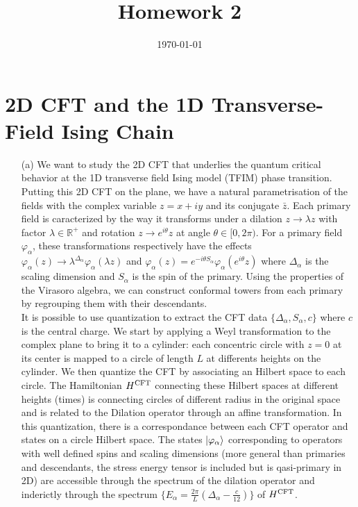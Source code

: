 \documentclass[10pt, a4paper]{article}
\title{Homework 2} %
\author{\PA} %
\date{\today} %
\begin{document}
\maketitlepage

\maketableofcontents


\footnotesize{

\section{2D CFT and the 1D Transverse-Field Ising Chain}

\begin{enumerate}
  \item[(a)] We want to study the 2D CFT that underlies the quantum critical behavior at the 1D transverse field Ising model (TFIM) phase transition. Putting this 2D CFT on the plane, we have a natural parametrisation of the fields with the complex variable $z = x+iy$ and its conjugate $\bar{z}$. Each primary field is caracterized by the way it transforms under a dilation $z \to \lambda z$ with factor $\lambda \in \mathbb{R}^+$ and rotation $z \to e^{i \theta} z$ at angle $\theta \in [0, 2\pi)$. For a primary field $\varphi_\alpha$, these transformations respectively have the effects $\varphi_\alpha(z) \to \lambda^{\Delta_\alpha}\varphi_{\alpha}(\lambda z)$ and $\varphi_{\alpha}(z) = e^{- i \theta S_\alpha} \varphi_{\alpha}(e^{i \theta} z)$ where $\Delta_\alpha$ is the scaling dimension and $S_\alpha$ is the spin of the primary. Using the properties of the Virasoro algebra, we can construct conformal towers from each primary by regrouping them with their descendants. \\
  
  It is possible to use quantization to extract the CFT data $\{\Delta_\alpha, S_\alpha, c\}$ where $c$ is the central charge. We start by applying a Weyl transformation to the complex plane to bring it to a cylinder: each concentric circle with $z=0$ at its center is mapped to a circle of length $L$ at differents heights on the cylinder. We then quantize the CFT by associating an Hilbert space to each circle. The Hamiltonian $H^{\rm CFT}$ connecting these Hilbert spaces at different heights (times) is connecting circles of different radius in the original space and is related to the Dilation operator through an affine transformation. In this quantization, there is a correspondance between each CFT operator and states on a circle Hilbert space. The states $\ket{\varphi_\alpha}$ corresponding to operators with well defined spins and scaling dimensions (more general than primaries and descendants, the stress energy tensor is included but is qasi-primary in 2D) are accessible through the spectrum of the dilation operator and inderictly through the spectrum $\{E_{\alpha} = \frac{2\pi}{L} (\Delta_\alpha - \frac{c}{12})\}$ of $H^{\rm CFT}$. \\


\end{enumerate}}
\end{document}
